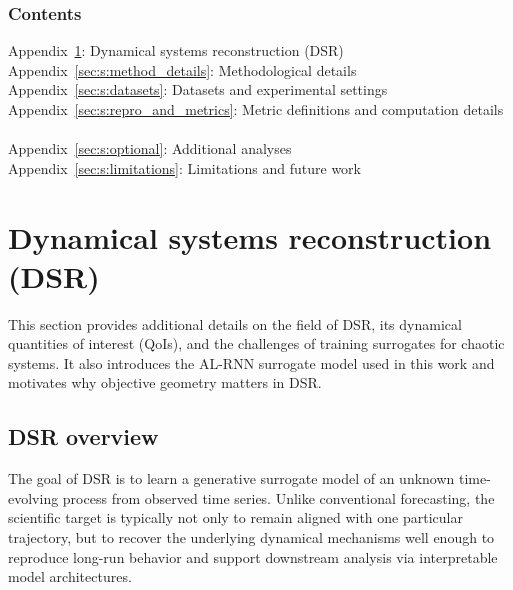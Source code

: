 \documentclass[twoside]{article}
\theoremstyle{plain}
\theoremstyle{definition}
\theoremstyle{remark}
\begin{document}
\renewcommand{\theHsection}{A\arabic{section}}
\renewcommand{\theHsubsection}{A\arabic{section}.\arabic{subsection}}
\renewcommand{\theHequation}{A\arabic{equation}}
\providecommand{\theHalgorithm}{\arabic{algorithm}}
\renewcommand{\theHalgorithm}{A\arabic{algorithm}}
\providecommand{\theHproposition}{\arabic{proposition}}
\renewcommand{\theHproposition}{A\arabic{proposition}}
\providecommand{\theHremark}{\arabic{remark}}
\renewcommand{\theHremark}{A\arabic{remark}}

\setcounter{equation}{0}
\setcounter{algorithm}{0}
\setcounter{proposition}{0}
\setcounter{remark}{0}



\subsubsection*{Contents}
\noindent Appendix~\ref{sec:a:primer}: Dynamical systems reconstruction (DSR) \dotfill\ \pageref{sec:a:primer}\\
Appendix~\ref{sec:s:method_details}: Methodological details \dotfill\ \pageref{sec:s:method_details}\\
Appendix~\ref{sec:s:datasets}: Datasets and experimental settings \dotfill\ \pageref{sec:s:datasets}\\
Appendix~\ref{sec:s:repro_and_metrics}: Metric definitions and computation details \dotfill\ \pageref{sec:s:repro_and_metrics}\\
Appendix~\ref{sec:s:optional}: Additional analyses \dotfill\ \pageref{sec:s:optional}\\
Appendix~\ref{sec:s:limitations}: Limitations and future work \dotfill\ \pageref{sec:s:limitations}

\setcounter{section}{-1}
\section{Dynamical systems reconstruction (DSR)}
\label{sec:a:primer}
This section provides additional details on the field of DSR, its dynamical quantities of interest (QoIs), and the challenges of training surrogates for chaotic systems. It also introduces the AL-RNN surrogate model used in this work and motivates why objective geometry matters in DSR.
\subsection{DSR overview}
The goal of DSR is to learn a 
generative surrogate model of an unknown time-evolving process from observed time series. Unlike conventional forecasting, the scientific target is typically not only to remain aligned with one particular trajectory, but to recover the underlying dynamical mechanisms well enough to reproduce long-run behavior and support downstream analysis via interpretable model architectures.
\end{document}
